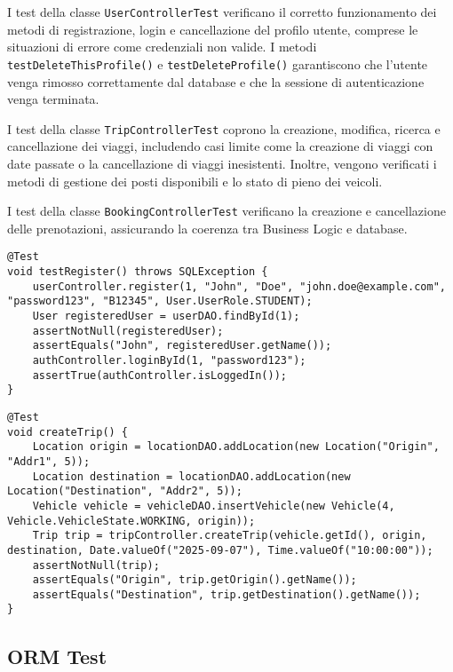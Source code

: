 \noindent I test della classe \texttt{UserControllerTest} verificano il corretto funzionamento dei metodi di registrazione, login e cancellazione del profilo utente, comprese le situazioni di errore come credenziali non valide. I metodi \texttt{testDeleteThisProfile()} e \texttt{testDeleteProfile()} garantiscono che l'utente venga rimosso correttamente dal database e che la sessione di autenticazione venga terminata.

\noindent I test della classe \texttt{TripControllerTest} coprono la creazione, modifica, ricerca e cancellazione dei viaggi, includendo casi limite come la creazione di viaggi con date passate o la cancellazione di viaggi inesistenti. Inoltre, vengono verificati i metodi di gestione dei posti disponibili e lo stato di pieno dei veicoli.

\noindent I test della classe \texttt{BookingControllerTest} verificano la creazione e cancellazione delle prenotazioni, assicurando la coerenza tra Business Logic e database.

\begin{lstlisting}[style=java, caption={Registrazione di un utente in UserControllerTest}]
@Test
void testRegister() throws SQLException {
    userController.register(1, "John", "Doe", "john.doe@example.com", "password123", "B12345", User.UserRole.STUDENT);
    User registeredUser = userDAO.findById(1);
    assertNotNull(registeredUser);
    assertEquals("John", registeredUser.getName());
    authController.loginById(1, "password123");
    assertTrue(authController.isLoggedIn());
}
\end{lstlisting}

\begin{lstlisting}[style=java, caption={Creazione di un viaggio in TripControllerTest}]
@Test
void createTrip() {
    Location origin = locationDAO.addLocation(new Location("Origin", "Addr1", 5));
    Location destination = locationDAO.addLocation(new Location("Destination", "Addr2", 5));
    Vehicle vehicle = vehicleDAO.insertVehicle(new Vehicle(4, Vehicle.VehicleState.WORKING, origin));
    Trip trip = tripController.createTrip(vehicle.getId(), origin, destination, Date.valueOf("2025-09-07"), Time.valueOf("10:00:00"));
    assertNotNull(trip);
    assertEquals("Origin", trip.getOrigin().getName());
    assertEquals("Destination", trip.getDestination().getName());
}
\end{lstlisting}

\subsection{ORM Test} \label{subsec:orm-test}

